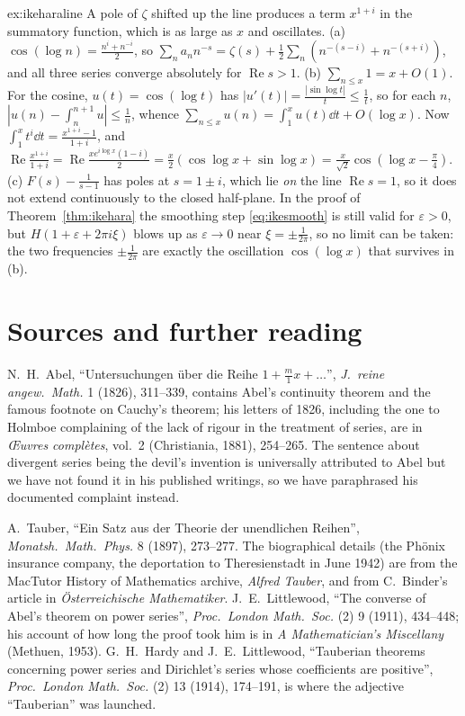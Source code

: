 \begin{solution}{ex:ikeharaline}
\idea A pole of $\zeta$ shifted up the line produces a term $x^{1+i}$ in the summatory function, which is as large as $x$ and oscillates.
\writeup (a) $\cos(\log n)=\frac{n^i+n^{-i}}2$, so $\sum_na_nn^{-s}=\zeta(s)+\frac12\sum_n(n^{-(s-i)}+n^{-(s+i)})$, and all three series converge absolutely for
$\operatorname{Re}s>1$. (b) $\sum_{n\le x}1=x+O(1)$. For the cosine, $u(t)=\cos(\log t)$ has $|u'(t)|=\frac{|\sin\log t|}t\le\frac1t$, so for each $n$,
$|u(n)-\int_n^{n+1}u|\le\frac1n$, whence $\sum_{n\le x}u(n)=\int_1^xu(t)\dd t+O(\log x)$. Now
$\int_1^xt^i\dd t=\frac{x^{1+i}-1}{1+i}$, and $\operatorname{Re}\frac{x^{1+i}}{1+i}=\operatorname{Re}\frac{x e^{i\log x}(1-i)}2=\frac x2(\cos\log x+\sin\log x)=\frac
x{\sqrt2}\cos(\log x-\frac\pi4)$. (c) $F(s)-\frac1{s-1}$ has poles at $s=1\pm i$, which lie \emph{on} the line $\operatorname{Re}s=1$, so it does not extend
continuously to the closed half-plane. In the proof of Theorem~\ref{thm:ikehara} the smoothing step \eqref{eq:ikesmooth} is still valid for $\varepsilon>0$, but
$H(1+\varepsilon+2\pi i\xi)$ blows up as $\varepsilon\to0$ near $\xi=\pm\frac1{2\pi}$, so no limit can be taken: the two frequencies $\pm\frac1{2\pi}$ are exactly the
oscillation $\cos(\log x)$ that survives in (b).
\end{solution}

\section*{Sources and further reading}

N.~H.~Abel, ``Untersuchungen \"uber die Reihe $1+\frac m1x+\dots$'', \emph{J.\ reine angew.\ Math.} 1 (1826), 311--339, contains Abel's continuity theorem
and the famous footnote on Cauchy's theorem; his letters of 1826, including the one to Holmboe complaining of the lack of rigour in the treatment of
series, are in \emph{\OE uvres compl\`etes}, vol.~2 (Christiania, 1881), 254--265. The sentence about divergent series being the devil's invention is
universally attributed to Abel but we have not found it in his published writings, so we have paraphrased his documented complaint instead.

A.~Tauber, ``Ein Satz aus der Theorie der unendlichen Reihen'', \emph{Monatsh.\ Math.\ Phys.} 8 (1897), 273--277. The biographical details (the Ph\"onix
insurance company, the deportation to Theresienstadt in June 1942) are from the MacTutor History of Mathematics archive, \emph{Alfred Tauber}, and from
C.~Binder's article in \emph{\"Osterreichische Mathematiker}. J.~E.~Littlewood, ``The converse of Abel's theorem on power series'', \emph{Proc.\ London
Math.\ Soc.} (2) 9 (1911), 434--448; his account of how long the proof took him is in \emph{A Mathematician's Miscellany} (Methuen, 1953). G.~H.~Hardy and
J.~E.~Littlewood, ``Tauberian theorems concerning power series and Dirichlet's series whose coefficients are positive'', \emph{Proc.\ London Math.\ Soc.}
(2) 13 (1914), 174--191, is where the adjective ``Tauberian'' was launched.

